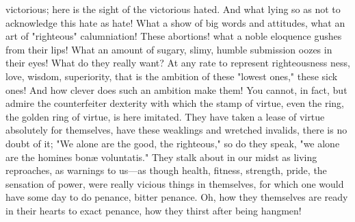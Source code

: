 \documentclass[12pt]{article}
\begin{document}
victorious; here is the sight of the victorious hated. And what lying so as not to acknowledge this hate as hate! What a show of big words and attitudes, what an art of "righteous" calumniation! These abortions! what a noble eloquence gushes from their lips! What an amount of sugary, slimy, humble submission oozes in their eyes! What do they really want? At any rate to represent righteousness ness, love, wisdom, superiority, that is the ambition of these "lowest ones," these sick ones! And how clever does such an ambition make them! You cannot, in fact, but admire the counterfeiter dexterity with which the stamp of virtue, even the ring, the golden ring of virtue, is here imitated. They have taken a lease of virtue absolutely for themselves, have these weaklings and wretched invalids, there is no doubt of it; "We alone are the good, the righteous," so do they speak, "we alone are the homines bonæ voluntatis." They stalk about in our midst as living reproaches, as warnings to us---as though health, fitness, strength, pride, the sensation of power, were really vicious things in themselves, for which one would have some day to do penance, bitter penance. Oh, how they themselves are ready in their hearts to exact penance, how they thirst after being hangmen!
\end{document}
